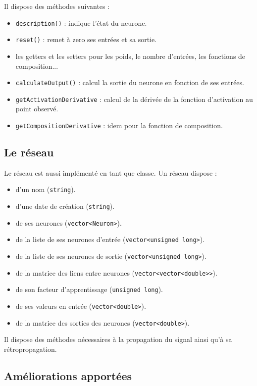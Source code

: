 \medskip

Il dispose des méthodes suivantes :
\begin{itemize}
  \item \verb+description()+ : indique l'état du neurone.
  \item \verb+reset()+ : remet à zero ses entrées et sa sortie.
  \item les getters et les setters pour les poids, le nombre d'entrées, les
  fonctions de composition...
  \item \verb+calculateOutput()+ : calcul la sortie du neurone en fonction
  de ses entrées.
  \item \verb+getActivationDerivative+ : calcul de la dérivée de la fonction
  d'activation au point observé.
  \item \verb+getCompositionDerivative+ : idem pour la fonction de composition.
\end{itemize}

\subsection{Le réseau}

Le réseau est aussi implémenté en tant que classe.
Un réseau dispose :
\begin{itemize}
  \item d'un nom (\verb+string+).
  \item d'une date de création (\verb+string+).
  \item de ses neurones (\verb+vector<Neuron>+).
  \item de la liste de ses neurones d'entrée (\verb+vector<unsigned long>+).
  \item de la liste de ses neurones de sortie (\verb+vector<unsigned long>+).
  \item de la matrice des liens entre neurones (\verb+vector<vector<double>>+).
  \item de son facteur d'apprentissage (\verb+unsigned long+).
  \item de ses valeurs en entrée (\verb+vector<double>+).
  \item de la matrice des sorties des neurones (\verb+vector<double>+).
\end{itemize}

\medskip

Il dispose des méthodes nécessaires à la propagation du signal ainsi qu'à
sa rétropropagation.

\subsection{Améliorations apportées}

